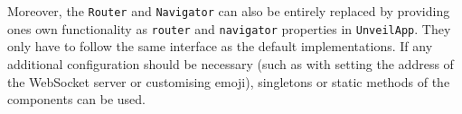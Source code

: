 Moreover, the \texttt{Router} and \texttt{Navigator} can also be entirely replaced by providing ones own functionality as \texttt{router} and \texttt{navigator} properties in \texttt{UnveilApp}. They only have to follow the same interface as the default implementations. If any additional configuration should be necessary (such as with setting the address of the WebSocket server or customising emoji), singletons or static methods of the components can be used.

